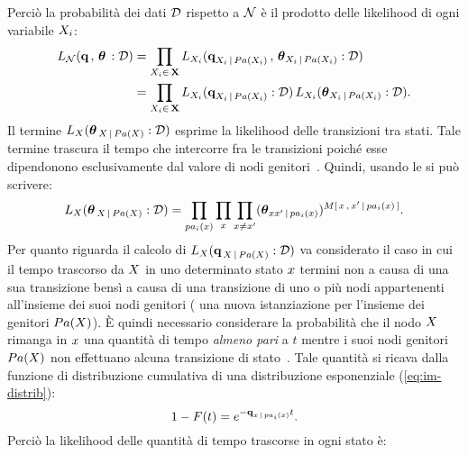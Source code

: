 Perciò la probabilità dei dati $\mathcal{D}$ rispetto a $\mathcal{N}$ è il prodotto delle likelihood di ogni variabile $\mathnormal{X_i}$:
\begin{align}\label{eq:ctbn-likelihood-decomp}
L_{\mathcal{N}}(\boldsymbol{\textbf{\text{q}}}\,,\,\boldsymbol{\textbf{\text{$\theta$}}}\,:\mathcal{D})&=\prod_{\mathnormal{X}_i\in\,\mathbf{X}}L_{\mathnormal{X}_i}(\boldsymbol{\textbf{\text{q}}}_{\mathnormal{X}_i\,\arrowvert\,Pa(\mathnormal{X}_i)}\,,\,\boldsymbol{\textbf{\text{$\theta$}}}_{\mathnormal{X}_i\,\arrowvert\,Pa(\mathnormal{X}_i)}:\mathcal{D}) \nonumber\\
&=\prod_{\mathnormal{X}_i\in\,\mathbf{X}} L_{\mathnormal{X}_i}(\boldsymbol{\textbf{\text{q}}}_{\mathnormal{X}_i\,\arrowvert\,Pa(\mathnormal{X}_i)}:\mathcal{D}) \, L_{\mathnormal{X}_i}(\boldsymbol{\textbf{\text{$\theta$}}}_{\mathnormal{X}_i\,\arrowvert\,Pa(\mathnormal{X}_i)}:\mathcal{D})\text{.}
\end{align}
Il termine $L_{\mathnormal{X}}(\boldsymbol{\textbf{\text{$\theta$}}}_{\,\mathnormal{X}\,\arrowvert\,Pa(\mathnormal{X})}:\mathcal{D})$ esprime la likelihood delle transizioni tra stati. Tale termine trascura il tempo che intercorre fra le transizioni poiché esse dipendonono esclusivamente dal valore di nodi genitori~\citep[si veda][3]{Nodelman2002}. Quindi, usando le \emph{\keyword{\stats{}}} si può scrivere:
\begin{equation}\label{eq:like-transitions}
L_{\setel{X}}(\param{$\theta$}_{\,\setel{X}\,\arrowvert\,Pa(\setel{X})}:\conceptsym{D})=\prod_{pa_i(\setel{x})} \prod_{x} \prod_{x\neq x^{\prime}}(\param{$\theta$}_{xx^{\prime}\,\arrowvert\,pa_i(\setel{x})})^{\mstat[x]{\setel{x}^{\prime}\,\arrowvert\,pa_i(\setel{x})}}\text{.}
\end{equation}
Per quanto riguarda il calcolo di $L_{\mathnormal{X}}(\boldsymbol{\textbf{\text{q}}}_{\,\mathnormal{X}\,\arrowvert\,Pa(\mathnormal{X})}:\mathcal{D})$ va considerato il caso in cui il tempo trascorso da $\mathnormal{X}$ in uno determinato stato $\mathnormal{x}$ termini non a causa di una sua transizione bensì a causa di una transizione di uno o più nodi appartenenti all'insieme dei suoi nodi genitori (\ie{} una nuova istanziazione per l'insieme dei genitori $Pa(\mathnormal{X})$). \`E quindi necessario considerare la probabilità che il nodo $\mathnormal{X}$ rimanga in $\mathnormal{x}$ una quantità di tempo \emph{almeno pari} a $t$ mentre i suoi nodi genitori $Pa(\mathnormal{X})$ non effettuano alcuna transizione di stato~\citep[si veda][3]{Nodelman2002}. Tale quantità si ricava dalla funzione di distribuzione cumulativa di una distribuzione esponenziale (\autoref{eq:im-distrib}):
\[
1-F(t)=e^{-\boldsymbol{\textbf{\text{q}}}_{\mathnormal{x}\,\arrowvert\,pa_i(\mathnormal{x})}t}\text{.}
\]
Perciò la likelihood delle quantità di tempo trascorse in ogni stato è:
